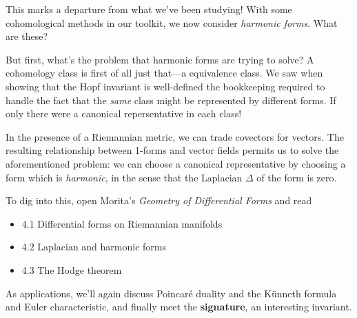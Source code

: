 \documentclass{homework}
\author{Jim Fowler}
\date{Week 10: Harmonic forms}
\begin{document}
\maketitle

This marks a departure from what we've been studying!  With some
cohomological methods in our toolkit, we now consider \textit{harmonic
forms}. What are these?

But first, what's the problem that harmonic forms are trying to solve?
A cohomology class is first of all just that---a equivalence class.
We saw when showing that the Hopf invariant is well-defined the
bookkeeping required to handle the fact that the \textit{same} class
might be represented by different forms.  If only there were a
canonical repersentative in each class!

In the presence of a Riemannian metric, we can trade covectors for
vectors.  The resulting relationship between 1-forms and vector fields
permits us to solve the aforementioned problem: we can choose a
canonical representative by choosing a form which is
\textit{harmonic}, in the sense that the Laplacian $\Delta$ of the
form is zero.

To dig into this, open Morita's \textit{Geometry of Differential Forms} and read
\begin{itemize}
\item 4.1 Differential forms on Riemannian manifolds
\item 4.2 Laplacian and harmonic forms
\item 4.3 The Hodge theorem
\end{itemize} As applications, we'll again discuss Poincar\'e duality
and the K\"unneth formula and Euler characteristic, and finally meet
the \textbf{signature}, an interesting invariant.
\end{document}
